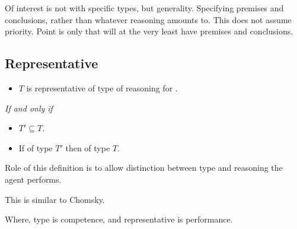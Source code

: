 \begin{note}
  Of interest is not with specific types, but generality.
  Specifying premises and conclusions, rather than whatever reasoning amounts to.
  This does not assume priority.
  Point is only that will at the very least have premises and conclusions.
\end{note}

\subsection{Representative}
\label{sec:represntative}

\begin{note}
  \begin{definition}
    \label{def:type-r}

    \begin{itemize}
    \item
      \(T\) is representative of type of reasoning for \vAgent{}.
    \end{itemize}

    \emph{If and only if}

    \begin{itemize}
    \item
      \(T' \subseteq T\).
    \item
      If of type \(T'\) then of type \(T\).
    \end{itemize}
  \end{definition}
  Role of this definition is to allow distinction between type and reasoning the agent performs.
\end{note}

\begin{note}
  This is similar to Chomsky.

  Where, type is competence, and representative is performance.
\end{note}


\section{}
\label{sec:sr2-1}

